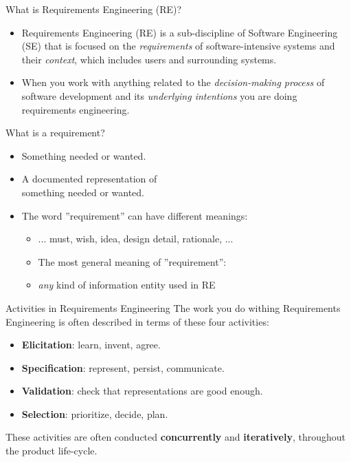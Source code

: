 \documentclass{beamer}
\begin{document}
\begin{frame}[fragile]{What is Requirements Engineering (RE)?}
\begin{itemize}
\item  Requirements Engineering (RE) is a sub-discipline of Software Engineering (SE) that is focused on the \textit{requirements} of software-intensive systems and their \textit{context}, which includes users and surrounding systems.
\item When you work with anything related to the \textit{decision-making process} of software development and its \emph{underlying intentions} you are doing requirements engineering.
\end{itemize}
\end{frame}

\begin{frame}[fragile]{What is a requirement?}
\begin{itemize}
\item Something needed or wanted.
\item A documented representation of \\something needed or wanted.
\item The word ''requirement'' can have different meanings:
\begin{itemize}
\item ... must, wish, idea, design detail, rationale, ...
\item The most general meaning of ''requirement'':
\item[] \emph{any} kind of information entity used in RE
\end{itemize}
\end{itemize}
\end{frame}

\begin{frame}[fragile]{Activities in Requirements Engineering}
The work you do withing Requirements Engineering is often described in terms of these four activities:
\begin{itemize}
\item \textbf{Elicitation}: learn, invent, agree.
\item \textbf{Specification}: represent, persist, communicate.
\item \textbf{Validation}: check that representations are good enough.
\item \textbf{Selection}: prioritize, decide, plan.
\end{itemize}
\vspace*{1em}
These activities are often conducted \textbf{concurrently} and \textbf{iteratively}, throughout the product life-cycle.
\end{frame}
\end{document}
